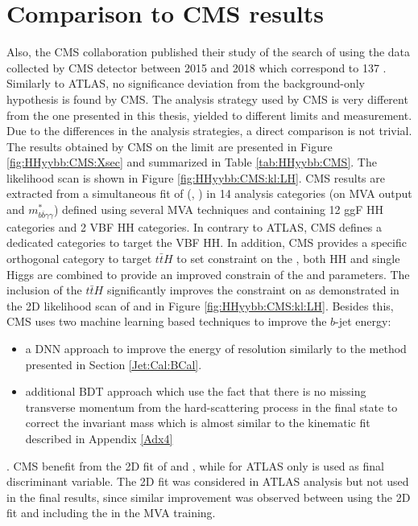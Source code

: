 \section{Comparison to CMS \HHyybb results}
\label{HHyybb:CMS}
Also, the CMS collaboration published their study of the search of \HHyybb using the data collected by CMS detector between 2015 and 2018 which correspond to 137 \ifb \cite{CMS_yybb}. Similarly to ATLAS, no significance deviation from the background-only hypothesis is found by CMS. The analysis strategy used by CMS is very different from the one presented in this thesis, yielded to different limits and \kl measurement. Due to the differences in the analysis strategies, a direct comparison is not trivial. The results obtained by CMS on the limit are presented in Figure \ref{fig:HHyybb:CMS:Xsec} and summarized in Table \ref{tab:HHyybb:CMS}. The \kl likelihood scan is shown in Figure \ref{fig:HHyybb:CMS:kl:LH}. CMS results are extracted from a simultaneous fit of (\myy , \mbb) in 14 analysis categories (on MVA output and $m_{b \bar{b} \gamma \gamma}^{*}$) defined using several MVA techniques and containing 12 ggF HH categories and 2 VBF HH categories. In contrary to ATLAS, CMS defines a dedicated categories to target the VBF HH. In addition, CMS provides a specific orthogonal category to target $t\bar{t}H$ to set constraint on the \kt, both HH and single Higgs are combined to provide an improved constrain of the \kl and \kt parameters. The inclusion of the $t\bar{t}H$ significantly improves the constraint on \kt as demonstrated in the 2D likelihood scan of \kl and \kt in Figure \ref{fig:HHyybb:CMS:kl:LH}. Besides this, CMS uses two machine learning based techniques to improve the $b$-jet energy:
\begin{itemize}
    \item a DNN approach to improve the energy of resolution similarly to the method presented in Section \ref{Jet:Cal:BCal}.
    \item additional BDT approach which use the fact that there is no missing transverse momentum from the hard-scattering process in the \HHyybb final state to correct the \mbb invariant mass which is almost similar to the kinematic fit described in Appendix \ref{Adx4}
\end{itemize}
. CMS benefit from the 2D fit of \myy and \mbb, while for ATLAS only \myy is used as final discriminant variable. The 2D fit was considered in ATLAS analysis but not used in the final results, since similar improvement was observed between using the 2D fit and including the \mbb in the MVA training.

